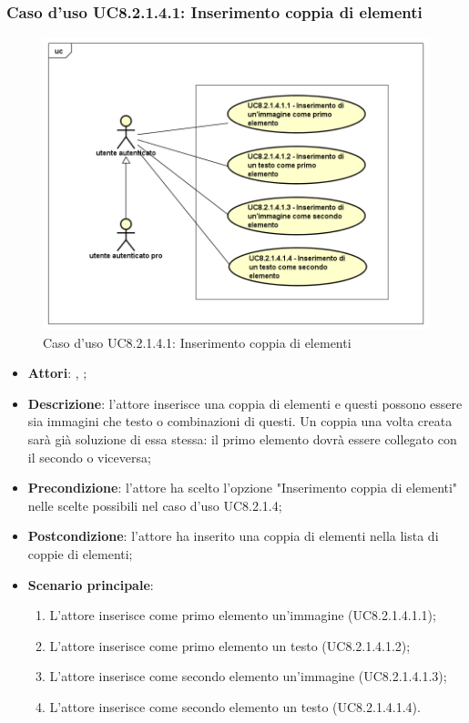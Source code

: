 	\subsubsection{Caso d'uso UC8.2.1.4.1: Inserimento coppia di elementi}
	\label{UC8.2.1.4.1}
	\begin{figure}[h]
		\centering
		\includegraphics[scale=0.5,keepaspectratio]{UML/UC8_2_1_4_1.png}
		\caption{Caso d'uso UC8.2.1.4.1: Inserimento coppia di elementi}
	\end{figure}
	\FloatBarrier
	\begin{itemize}
		\item \textbf{Attori}: \uau, \uaupro;
		\item \textbf{Descrizione}: l'attore inserisce una coppia di elementi e questi possono essere sia immagini che testo o combinazioni di questi. Un coppia una volta creata sarà già soluzione di essa stessa: il primo elemento dovrà essere collegato con il secondo o viceversa; 
		\item \textbf{Precondizione}: l'attore ha scelto l'opzione "Inserimento coppia di elementi" nelle scelte possibili nel caso d'uso UC8.2.1.4;
		\item \textbf{Postcondizione}: l'attore ha inserito una coppia di elementi nella lista di coppie di elementi; 
		\item \textbf{Scenario principale}: 
		\begin{enumerate}
			\item L'attore inserisce come primo elemento un'immagine (UC8.2.1.4.1.1);
			\item L'attore inserisce come primo elemento un testo (UC8.2.1.4.1.2);
			\item L'attore inserisce come secondo elemento un'immagine (UC8.2.1.4.1.3);
			\item L'attore inserisce come secondo elemento un testo (UC8.2.1.4.1.4).	
		\end{enumerate}
	\end{itemize}
	
